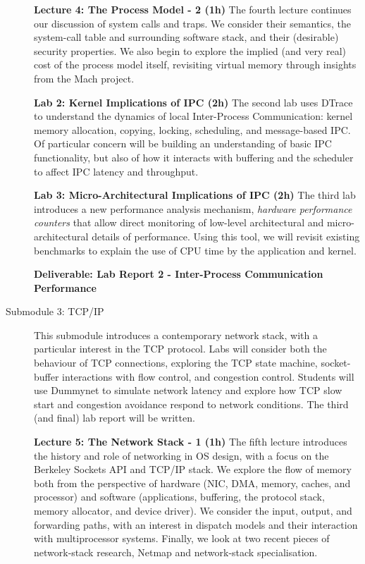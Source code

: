 \documentclass[a4paper,10pt]{article}
\begin{document}
\begin{description}
  \noindent
  \textbf{Lecture 4: The Process Model - 2 (1h)}
  The fourth lecture continues our discussion of system calls and traps.
  We consider their semantics, the system-call table and surrounding software
  stack, and their (desirable) security properties.
  We also begin to explore the implied (and very real) cost of the process
  model itself, revisiting virtual memory through insights from the Mach
  project.

  \noindent
  \textbf{Lab 2: Kernel Implications of IPC (2h)}
  The second lab uses DTrace to understand the dynamics of local
  Inter-Process Communication: kernel memory allocation, copying, locking,
  scheduling, and message-based IPC.
  Of particular concern will be building an understanding of basic IPC
  functionality, but also of how it interacts with buffering and the scheduler
  to affect IPC latency and throughput.

  \noindent
  \textbf{Lab 3: Micro-Architectural Implications of IPC (2h)}
  The third lab introduces a new performance analysis mechanism,
  \textit{hardware performance counters} that allow direct monitoring of
  low-level architectural and micro-architectural details of performance.
  Using this tool, we will revisit existing benchmarks to explain the use of
  CPU time by the application and kernel.

  \noindent
  \textbf{Deliverable: Lab Report 2 - Inter-Process Communication Performance}

\item[Submodule 3: TCP/IP]
  This submodule introduces a contemporary network stack, with a particular
  interest in the TCP protocol.
  Labs will consider both the behaviour of TCP connections, exploring the TCP
  state machine, socket-buffer interactions with flow control, and congestion
  control.
  Students will use Dummynet to simulate network latency and explore how TCP
  slow start and congestion avoidance respond to network conditions.
  The third (and final) lab report will be written.

  \noindent
  \textbf{Lecture 5: The Network Stack - 1 (1h)}
  The fifth lecture introduces the history and role of networking in OS
  design, with a focus on the Berkeley Sockets API and TCP/IP stack.
  We explore the flow of memory both from the perspective of hardware (NIC,
  DMA, memory, caches, and processor) and software (applications, buffering,
  the protocol stack, memory allocator, and device driver).
  We consider the input, output, and forwarding paths, with an interest in
  dispatch models and their interaction with multiprocessor systems.
  Finally, we look at two recent pieces of network-stack research, Netmap and
  network-stack specialisation.


\end{description}
\end{document}
